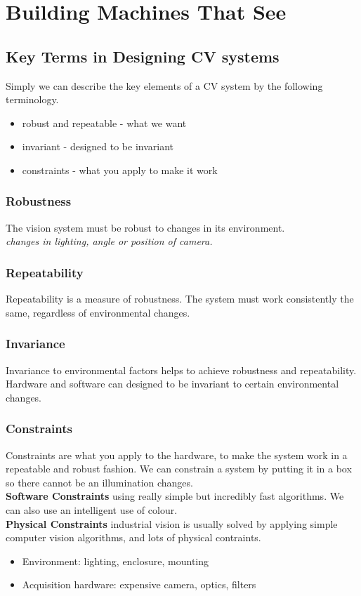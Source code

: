 \section{Building Machines That See}

\subsection{Key Terms in Designing CV systems}
Simply we can describe the key elements of a CV system by the following terminology.
\begin{itemize}
    \itemsep0em
    \item robust and repeatable - what we want
    \item invariant - designed to be invariant
    \item constraints - what you apply to make it work
\end{itemize}

\subsubsection{Robustness}
The vision system must be robust to changes in its environment. \\
\noindent \textit{changes in lighting, angle or position of camera.}

\subsubsection{Repeatability}
Repeatability is a measure of robustness. The system must work consistently the same, regardless of environmental changes.

\subsubsection{Invariance}
Invariance to environmental factors helps to achieve robustness and repeatability. Hardware and software can designed to be invariant to certain environmental changes.

\subsubsection{Constraints}
Constraints are what you apply to the hardware, to make the system work in a repeatable and robust fashion. We can constrain a system by putting it in a box so there cannot be an illumination changes. \\

\noindent \textbf{Software Constraints} using really simple but incredibly fast algorithms. We can also use an intelligent use of colour. \\

\noindent \textbf{Physical Constraints} industrial vision is usually solved by applying simple computer vision algorithms, and lots of physical contraints.
\begin{itemize}
    \item Environment: lighting, enclosure, mounting
    \item Acquisition hardware: expensive camera, optics, filters
\end{itemize}

